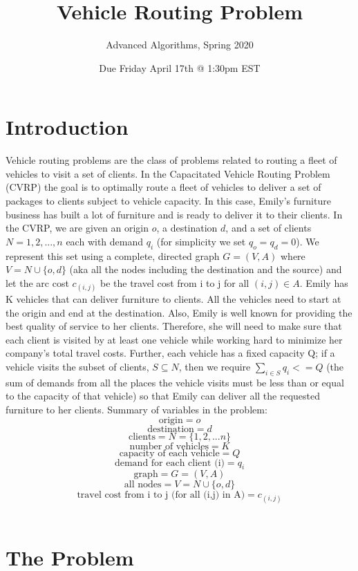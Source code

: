 \documentclass{article}
\title{Vehicle Routing Problem}
\author{Advanced Algorithms, Spring 2020}
\date{Due Friday April 17th @ 1:30pm EST}
\begin{document}
\maketitle

\section{Introduction}

Vehicle routing problems are the class of problems related to routing a fleet of vehicles to visit a set of clients. In the Capacitated Vehicle Routing Problem (CVRP) the goal is to optimally route a fleet of vehicles to deliver a set of packages to clients subject to vehicle capacity. In this case, Emily's furniture business has built a lot of furniture and is ready to deliver it to their clients. In the CVRP, we are given an origin $o$, a destination $d$, and a set of clients $N = {1, 2,...,n}$ each with demand $q_i$ (for simplicity we set $q_o = q_d = 0$). We represent this set using a complete, directed graph $G = (V, A)$ where $V = N \cup \{o, d\}$ (aka all the nodes including the destination and the source) and let the arc cost $c_{(i,j)}$ be the travel cost from i to j for all $(i, j) \in A$. Emily has K vehicles that can deliver furniture to clients. All the vehicles need to start at the origin and end at the destination. Also, Emily is well known for providing the best quality of service to her clients. Therefore, she will need to make sure that each client is visited by at least one vehicle while working hard to minimize her company's total travel costs. Further, each vehicle has a fixed capacity Q; if a vehicle visits the subset of clients, $S \subseteq N$, then we require $\sum_{i \in S}{q_i} <= Q$ (the sum of demands from all the places the vehicle visits must be less than or equal to the capacity of that vehicle) so that Emily can deliver all the requested furniture to her clients.
\bigbreak
Summary of variables in the problem:\\
\[ \mbox{origin} = o \]
\[ \mbox{destination} = d \]
\[ \mbox{clients} = N = \{1,2,...n\} \]
\[ \mbox{number of vehicles} = K \]
\[ \mbox{capacity of each vehicle} = Q \]
\[ \mbox{demand for each client (i)} = q_i \]
\[ \mbox{graph} = G = (V, A) \]
\[ \mbox{all nodes} = V = N \cup \{o, d\} \]
\[ \mbox{travel cost from i to j (for all (i,j) in A)} = c_{(i,j)} \]
\\

\section{The Problem}
\end{document}
